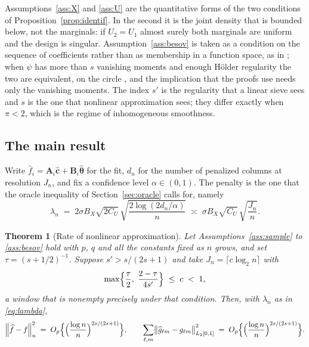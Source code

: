 \documentclass[12pt]{article} %
\newtheorem{theorem}{Theorem}
\theoremstyle{definition}
\newcommand{\normn}[1]{\left\lVert #1 \right\rVert_{n}}
\newcommand{\cv}{\ell}
\newcommand{\md}{m}
\newcommand{\gcomp}[2]{g_{#1#2}}
\newcommand{\btheta}{\boldsymbol{\theta}}
\newcommand{\thetahat}{\widehat{\btheta}}
\newcommand{\chat}{\widehat{\mathbf{c}}}
\newcommand{\penn}{\lambda_{n}}
\newcommand{\seff}{s'}
\newcommand{\Amat}{\mathbf{A}}
\newcommand{\Bmat}{\mathbf{B}}
\begin{document}
Assumptions~\ref{ass:X} and \ref{ass:U} are the quantitative forms of the two
conditions of Proposition~\ref{prop:identif}. In the second it is the joint
density that is bounded below, not the marginals: if $U_2 = U_1$ almost surely
both marginals are uniform and the design is singular.
Assumption~\ref{ass:besov} is taken as a condition on the sequence of
coefficients rather than as membership in a function space, as in
\citet{Klopp-Pensky-2015}; when $\psi$ has more than $s$ vanishing moments and
enough Hölder regularity the two are equivalent, on the circle
\citep[Section 3.6]{Cohen-2003}, and the implication that the proofs use needs
only the vanishing moments. The index $\seff$ is the regularity that a linear
sieve sees and $s$ is the one that nonlinear approximation sees; they differ
exactly when $\pi < 2$, which is the regime of inhomogeneous smoothness.

\subsection{The main result}
\label{sec:main}

Write $\widehat{f}_i = \Amat_i\chat + \Bmat_i\thetahat$ for the fit, $d_n$ for
the number of penalized columns at resolution $J_n$, and fix a confidence
level $\alpha \in (0,1)$. The penalty is the one that the oracle inequality of
Section~\ref{sec:oracle} calls for, namely
\begin{equation}
  \label{eq:lambda}
  \penn \;=\; 2\sigma B_X\sqrt{2C_U}\,
  \sqrt{\frac{2\log(2d_n/\alpha)}{n}} \;\asymp\;
  \sigma B_X \sqrt{C_U}\,\sqrt{\frac{J_n}{n}} .
\end{equation}

\begin{theorem}[Rate of nonlinear approximation]
\label{thm:main}
Let Assumptions~\ref{ass:sample} to \ref{ass:besov} hold with $p$, $q$ and all
the constants fixed as $n$ grows, and set $\tau = (s+1/2)^{-1}$. Suppose
$\seff > s/(2s+1)$ and take $J_n = \lceil c \log_2 n\rceil$ with
\begin{equation}
  \label{eq:window}
  \max\Bigl\{\frac{\tau}{2},\; \frac{2-\tau}{4\seff}\Bigr\}
  \;\le\; c \;<\; 1 ,
\end{equation}
a window that is nonempty precisely under that condition. Then, with $\penn$
as in \eqref{eq:lambda},
\[
  \normn{\widehat{f}-f}^{2}
  \;=\; O_p\Bigl\{\Bigl(\frac{\log n}{n}\Bigr)^{2s/(2s+1)}\Bigr\},
  \qquad
  \sum_{\cv,\md}\bigl\lVert \widehat{g}_{\cv\md}-\gcomp{\cv}{\md}
  \bigr\rVert_{L_2[0,1]}^{2}
  \;=\; O_p\Bigl\{\Bigl(\frac{\log n}{n}\Bigr)^{2s/(2s+1)}\Bigr\} .
\]
\end{theorem}
\end{document}
